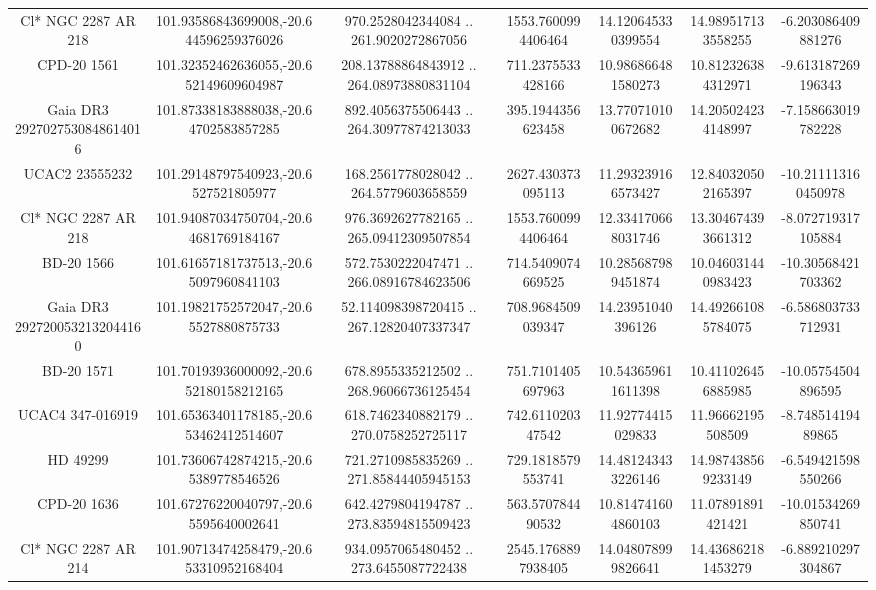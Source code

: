 \begin{table}
\begin{tabular}{ccccccc}
Cl* NGC 2287     AR     218 & 101.93586843699008,-20.644596259376026 & 970.2528042344084 .. 261.9020272867056 & 1553.7600994406464 & 14.120645330399554 & 14.989517133558255 & -6.203086409881276 \\
CPD-20  1561 & 101.32352462636055,-20.652149609604987 & 208.13788864843912 .. 264.08973880831104 & 711.2375533428166 & 10.986866481580273 & 10.812326384312971 & -9.613187269196343 \\
Gaia DR3 2927027530848614016 & 101.87338183888038,-20.64702583857285 & 892.4056375506443 .. 264.30977874213033 & 395.1944356623458 & 13.770710100672682 & 14.205024234148997 & -7.158663019782228 \\
UCAC2  23555232 & 101.29148797540923,-20.6527521805977 & 168.2561778028042 .. 264.5779603658559 & 2627.430373095113 & 11.293239166573427 & 12.840320502165397 & -10.211113160450978 \\
Cl* NGC 2287     AR     218 & 101.94087034750704,-20.64681769184167 & 976.3692627782165 .. 265.09412309507854 & 1553.7600994406464 & 12.334170668031746 & 13.304674393661312 & -8.072719317105884 \\
BD-20  1566 & 101.61657181737513,-20.65097960841103 & 572.7530222047471 .. 266.08916784623506 & 714.5409074669525 & 10.285687989451874 & 10.046031440983423 & -10.30568421703362 \\
Gaia DR3 2927200532132044160 & 101.19821752572047,-20.65527880875733 & 52.114098398720415 .. 267.12820407337347 & 708.9684509039347 & 14.23951040396126 & 14.492661085784075 & -6.586803733712931 \\
BD-20  1571 & 101.70193936000092,-20.652180158212165 & 678.8955335212502 .. 268.96066736125454 & 751.7101405697963 & 10.543659611611398 & 10.411026456885985 & -10.05754504896595 \\
UCAC4 347-016919 & 101.65363401178185,-20.653462412514607 & 618.7462340882179 .. 270.0758252725117 & 742.611020347542 & 11.92774415029833 & 11.96662195508509 & -8.74851419489865 \\
HD  49299 & 101.73606742874215,-20.65389778546526 & 721.2710985835269 .. 271.85844405945153 & 729.1818579553741 & 14.481243433226146 & 14.987438569233149 & -6.549421598550266 \\
CPD-20  1636 & 101.67276220040797,-20.65595640002641 & 642.4279804194787 .. 273.83594815509423 & 563.570784490532 & 10.814741604860103 & 11.07891891421421 & -10.01534269850741 \\
Cl* NGC 2287     AR     214 & 101.90713474258479,-20.653310952168404 & 934.0957065480452 .. 273.6455087722438 & 2545.1768897938405 & 14.048078999826641 & 14.436862181453279 & -6.889210297304867 \\

\end{tabular}
\end{table}
